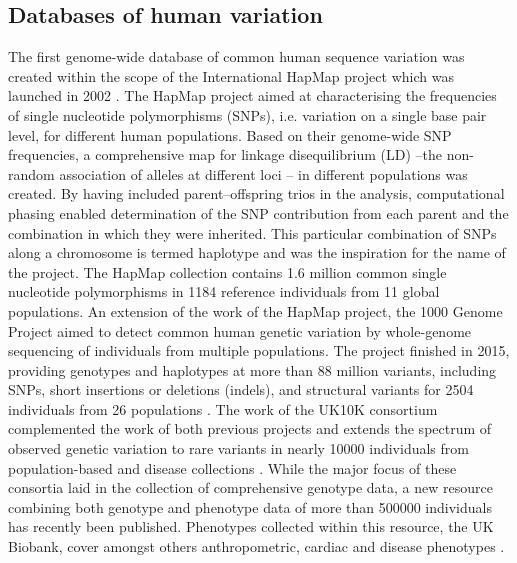 \subsection{Databases of human variation}
\label{subsection:databases}
The first genome-wide database of common human sequence variation was created within the scope of the International HapMap project which was launched in 2002 \citep{HapMap2005,HapMap2007,HapMap2010}.
The HapMap project aimed at characterising the frequencies of single nucleotide polymorphisms (SNPs), i.e. variation on a single base pair level, for different human populations. Based on their genome-wide SNP frequencies, a comprehensive map for linkage disequilibrium (LD) --the non-random association of alleles at different loci \citep{Lewontin1960}-- in different populations was created. By having included parent–offspring trios in the analysis, computational phasing \citep{Stephens2001} enabled determination of the SNP contribution from each parent and the combination in which they were inherited. This particular combination of SNPs along a chromosome is termed haplotype and was the inspiration for the name of the project. The HapMap collection contains 1.6 million common single nucleotide polymorphisms in \num{1184} reference individuals from 11 global populations. An extension of the work of the HapMap project, the 1000 Genome Project aimed to detect common human genetic variation by whole-genome sequencing of individuals from multiple populations. The project finished in 2015, providing genotypes and haplotypes at more than 88 million variants, including SNPs, short insertions or deletions (indels), and structural variants for \num{2504} individuals from 26 populations \citep{1000Genomes2011,1000Genomes2012,1000Genomes2015}. The work of the UK10K consortium complemented the work of both previous projects and extends the spectrum of observed genetic variation to rare variants in nearly \num{10000} individuals from population-based and disease collections \citep{UK10KConsortium2015}. While the major focus of these consortia laid in the collection of comprehensive genotype data, a new resource combining both genotype and phenotype data of more than \num{500000} individuals has recently been published. Phenotypes collected within this resource, the UK Biobank, cover amongst others anthropometric, cardiac and disease phenotypes \citep{Sudlow2015}.

